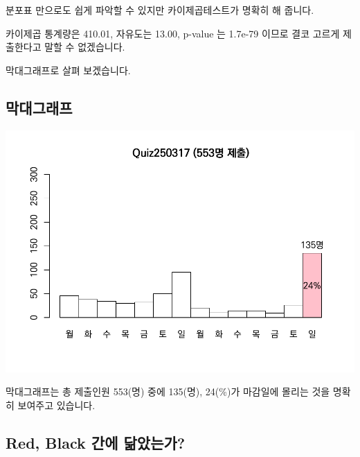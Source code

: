 \documentclass[
]{book}
\begin{document}
분포표 만으로도 쉽게 파악할 수 있지만 카이제곱테스트가 명확히 해 줍니다.

카이제곱 통계량은 410.01, 자유도는 13.00, p-value 는 1.7e-79 이므로 결코 고르게 제출한다고 말할 수 없겠습니다.

막대그래프로 살펴 보겠습니다.

\subsection{막대그래프}\label{uxb9c9uxb300uxadf8uxb798uxd504-2}

\includegraphics{Quiz_report_2025_files/figure-latex/unnamed-chunk-63-1.pdf}

막대그래프는 총 제출인원 553(명) 중에 135(명), 24(\%)가 마감일에 몰리는 것을 명확히 보여주고 있습니다.

\subsection{Red, Black 간에 닮았는가?}\label{red-black-uxac04uxc5d0-uxb2eeuxc558uxb294uxac00-2}
\end{document}
